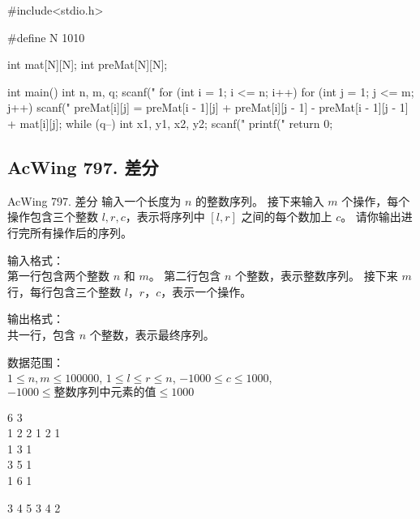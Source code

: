 \begin{mycpponecol}[子矩阵的和]
#include<stdio.h>

#define N 1010

int mat[N][N];
int preMat[N][N];

int main()
{
    int n, m, q;
    scanf("%
    for (int i = 1; i <= n; i++) {
        for (int j = 1; j <= m; j++) {
            scanf("%
            preMat[i][j] = preMat[i - 1][j] + preMat[i][j - 1] - preMat[i - 1][j - 1] + mat[i][j];
        }
    }
    while (q--) {
        int x1, y1, x2, y2;
        scanf("%
        printf("%
    }
    return 0;
}
\end{mycpponecol}

\subsection{AcWing 797. 差分}
\begin{titledbox}{AcWing 797. 差分}
    输入一个长度为 $n$ 的整数序列。
    接下来输入 $m$ 个操作，每个操作包含三个整数 $l, r, c$，表示将序列中 $[l, r]$ 之间的每个数加上 $c$。
    请你输出进行完所有操作后的序列。

    输入格式：\\
    第一行包含两个整数 $n$ 和 $m$。
    第二行包含 $n$ 个整数，表示整数序列。
    接下来 $m$ 行，每行包含三个整数 $l，r，c$，表示一个操作。
    
    输出格式：\\
    共一行，包含 $n$ 个整数，表示最终序列。
    
    数据范围：\\
    $1 \le n,m \le 100000$,
    $1 \le l \le r \le n$,
    $-1000 \le c \le 1000$,
    $-1000 \le \text{整数序列中元素的值} \le 1000$
    
    \begin{inputblock}
        6 3 \\
        1 2 2 1 2 1 \\
        1 3 1 \\
        3 5 1 \\
        1 6 1 \\
    \end{inputblock}
    \begin{outputblock}
        3 4 5 3 4 2
    \end{outputblock}
\end{titledbox}

